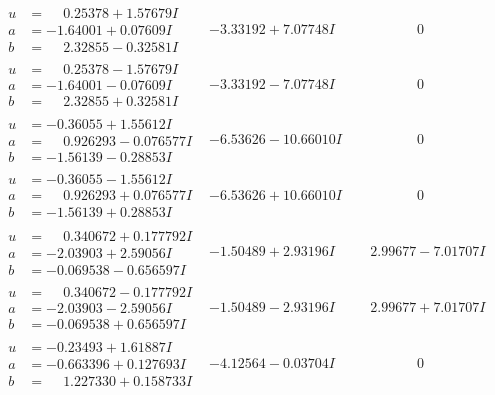 \documentclass[1p]{elsarticle_modified}
\theoremstyle{definition}
\begin{document}
$$\begin{array}{c|c|c}
\begin{aligned}
u &= \phantom{-}0.25378 + 1.57679 I \\
a &= -1.64001 + 0.07609 I \\
b &= \phantom{-}2.32855 - 0.32581 I\end{aligned}
 & -3.33192 + 7.07748 I & \phantom{-0.000000 } 0 \\ \hline\begin{aligned}
u &= \phantom{-}0.25378 - 1.57679 I \\
a &= -1.64001 - 0.07609 I \\
b &= \phantom{-}2.32855 + 0.32581 I\end{aligned}
 & -3.33192 - 7.07748 I & \phantom{-0.000000 } 0 \\ \hline\begin{aligned}
u &= -0.36055 + 1.55612 I \\
a &= \phantom{-}0.926293 - 0.076577 I \\
b &= -1.56139 - 0.28853 I\end{aligned}
 & -6.53626 - 10.66010 I & \phantom{-0.000000 } 0 \\ \hline\begin{aligned}
u &= -0.36055 - 1.55612 I \\
a &= \phantom{-}0.926293 + 0.076577 I \\
b &= -1.56139 + 0.28853 I\end{aligned}
 & -6.53626 + 10.66010 I & \phantom{-0.000000 } 0 \\ \hline\begin{aligned}
u &= \phantom{-}0.340672 + 0.177792 I \\
a &= -2.03903 + 2.59056 I \\
b &= -0.069538 - 0.656597 I\end{aligned}
 & -1.50489 + 2.93196 I & \phantom{-}2.99677 - 7.01707 I \\ \hline\begin{aligned}
u &= \phantom{-}0.340672 - 0.177792 I \\
a &= -2.03903 - 2.59056 I \\
b &= -0.069538 + 0.656597 I\end{aligned}
 & -1.50489 - 2.93196 I & \phantom{-}2.99677 + 7.01707 I \\ \hline\begin{aligned}
u &= -0.23493 + 1.61887 I \\
a &= -0.663396 + 0.127693 I \\
b &= \phantom{-}1.227330 + 0.158733 I\end{aligned}
 & -4.12564 - 0.03704 I & \phantom{-0.000000 } 0 \\ \hline\begin{aligned}

\end{aligned}
\end{array}$$
\end{document}
